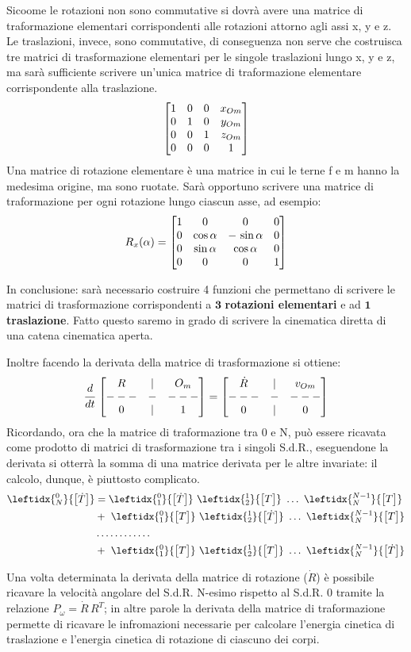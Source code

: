Sicoome le rotazioni non sono commutative si dovrà avere una matrice di traformazione elementari corrispondenti alle rotazioni attorno agli assi x, y e z. Le traslazioni, invece, sono commutative, di conseguenza non serve che costruisca tre matrici di trasformazione elementari per le singole traslazioni lungo x, y e z, ma sarà sufficiente scrivere un'unica matrice di traformazione elementare corrispondente alla traslazione.
\[\begin{bmatrix}1&0&0&x_{Om}\\0&1&0&y_{Om}\\0&0&1&z_{Om}\\0&0&0&1\end{bmatrix}\]
Una matrice di rotazione elementare è una matrice in cui le terne f e m hanno la medesima origine, ma sono ruotate. Sarà opportuno scrivere una matrice di traformazione per ogni rotazione lungo ciascun asse, ad esempio:
\[R_x(\alpha) = \begin{bmatrix}1&0&0&0\\0&\cos{\alpha}&-\,\sin{\alpha}&0\\0&\sin{\alpha}&\cos{\alpha}&0\\0&0&0&1\end{bmatrix}\]

In conclusione: sarà necessario costruire 4 funzioni che permettano di scrivere le matrici di trasformazione corrispondenti a $\mathbf{3}$ \textbf{rotazioni elementari} e ad $\mathbf{1}$ \textbf{traslazione}. Fatto questo saremo in grado di scrivere la cinematica diretta di una catena cinematica aperta.

Inoltre facendo la derivata della matrice di trasformazione si ottiene:
\[\cfrac{d}{dt}\,\begin{bmatrix}R&|&O_m\\---&-&---\\0&|&1\end{bmatrix} = \begin{bmatrix}\dot{R}&|&v_{Om}\\---&-&---\\0&|&0\end{bmatrix}\]
Ricordando, ora che la matrice di traformazione tra 0 e N, può essere ricavata come prodotto di matrici di trasformazione tra i singoli S.d.R., eseguendone la derivata si otterrà la somma di una matrice derivata per le altre invariate: il calcolo, dunque, è piuttosto complicato.
\begin{align*}
\leftidx{^0_N}{\M{\dot{T}}} &= \leftidx{^0_1}{\M{\dot{T}}}\,\,\leftidx{^1_2}{\M{T}}\,\,\dots\,\,\leftidx{_N^{N-1}}{\M{T}}\\
&+\,\,\leftidx{^0_1}{\M{T}}\,\,\leftidx{^1_2}{\M{\dot{T}}}\,\,\dots\,\,\leftidx{_N^{N-1}}{\M{T}}\\
&\dots\dots\dots\dots\\
&+\,\,\leftidx{^0_1}{\M{T}}\,\,\leftidx{^1_2}{\M{T}}\,\,\dots\,\,\leftidx{_N^{N-1}}{\M{\dot{T}}}
\end{align*}

Una volta determinata la derivata della matrice di rotazione ($\dot{R}$) è possibile ricavare la velocità angolare del S.d.R. N-esimo rispetto al S.d.R. 0 tramite la relazione $P_{\omega} = \dot{R}\,R^T$; in altre parole la derivata della matrice di traformazione permette di ricavare le infromazioni necessarie per calcolare l'energia cinetica di traslazione e l'energia cinetica di rotazione di ciascuno dei corpi.

